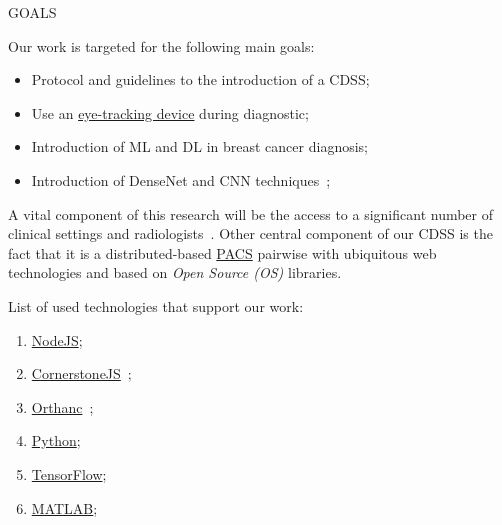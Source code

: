 \documentclass[final]{beamer}
\begin{document}
\begin{frame}[t, fragile = singleslide]{}
\begin{columns}[t]
\begin{column}{0.45\textwidth}
\begin{block}{GOALS}

\vspace{10mm}

Our work is targeted for the following main goals:

\vspace{10mm}

\begin{itemize}
\item Protocol and guidelines to the introduction of a CDSS;
\item Use an \hyperlink{https://gaming.tobii.com/products/}{eye-tracking device} during diagnostic;
\item Introduction of ML and DL in breast cancer diagnosis;
\item Introduction of DenseNet and CNN techniques~\cite{maicas2017deep};
\end{itemize}

\vspace{10mm}

A vital component of this research will be the access to a significant number of clinical settings and radiologists~\cite{calisto2017mimbcdui, calisto2019midaaiarfuv}.
Other central component of our CDSS is the fact that it is a distributed-based \hyperlink{https://www.sciencedirect.com/topics/medicine-and-dentistry/picture-archiving-and-communication-system}{PACS} pairwise with ubiquitous web technologies and based on \textit{Open Source (OS)} libraries.

\vspace{10mm}

List of used technologies that support our work:

\vspace{10mm}

\begin{enumerate}
\item \hyperlink{https://nodejs.org}{NodeJS};
\item \hyperlink{https://cornerstonejs.org/}{CornerstoneJS}~\cite{hostetter2018integration};
\item \hyperlink{https://www.orthanc-server.com/}{Orthanc}~\cite{Jodogne:ISBI2013};
\item \hyperlink{https://www.python.org/}{Python};
\item \hyperlink{https://www.tensorflow.org/}{TensorFlow};
\item \hyperlink{https://www.mathworks.com/products/matlab.html}{MATLAB};
\end{enumerate}


\end{block}
\end{column}
\end{columns}
\end{frame}
\end{document}
